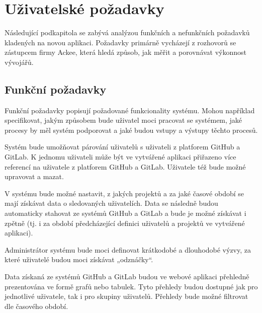 \section{Uživatelské požadavky}
Následující podkapitola se zabývá analýzou funkčních a nefunkčních požadavků kladených na novou aplikaci. Požadavky primárně vycházejí z rozhovorů se zástupcem firmy Ackee, která hledá způsob, jak měřit a porovnávat výkonnost vývojářů.

\subsection{Funkční požadavky}
Funkční požadavky popisují požadované funkcionality systému. Mohou například specifikovat, jakým způsobem bude uživatel moci pracovat se systémem, jaké procesy by měl systém podporovat a jaké budou vstupy a výstupy těchto procesů.

\begin{enumerate}[label=\textcolor{decoration}{\textbf{F\arabic*}}, leftmargin=9mm]
    Systém bude umožňovat párování uživatelů s uživateli z platforem GitHub a GitLab. K jednomu uživateli může být ve vytvářené aplikaci přiřazeno více referencí na uživatele z platforem GitHub a GitLab. Uživatele též bude možné upravovat a mazat.

    V systému bude možné nastavit, z jakých projektů a za jaké časové období se mají získávat data o sledovaných uživatelích. Data se následně budou automaticky stahovat ze systémů GitHub a GitLab a bude je možné získávat i zpětně (tj. i za období předcházející definici uživatelů a projektů ve vytvářené aplikaci).

    Administrátor systému bude moci definovat krátkodobé a dlouhodobé výzvy, za které uživatelé budou moci získávat „odznáčky“.

    Data získaná ze systémů GitHub a GitLab budou ve webové aplikaci přehledně prezentována ve formě grafů nebo tabulek. Tyto přehledy budou dostupné jak pro jednotlivé uživatele, tak i pro skupiny uživatelů. Přehledy bude možné filtrovat dle časového období.
\end{enumerate}

\newpage

